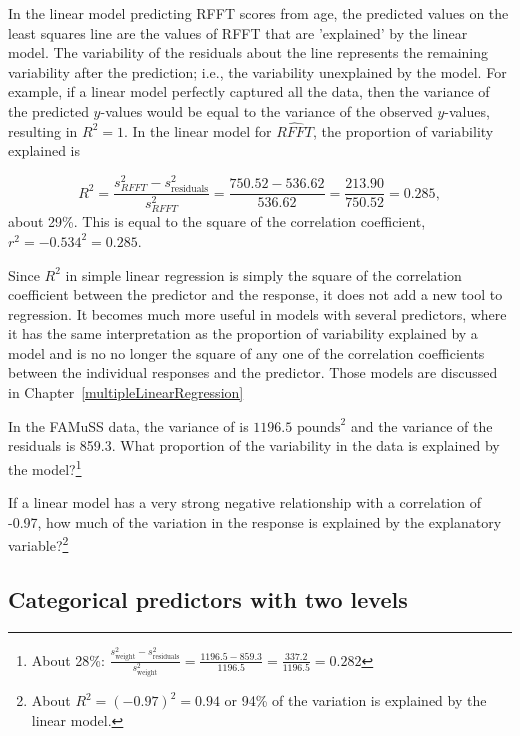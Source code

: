 In the linear model predicting RFFT scores from age, the predicted values on the least squares line are the values of RFFT that are 'explained' by the linear model. The variability of the residuals about the line represents the remaining variability after the prediction; i.e., the variability unexplained by the model. For example, if a linear model perfectly captured all the data, then the variance of the predicted $y$-values would be equal to the variance of the observed $y$-values, resulting in $R^2 = 1$. In the linear model for $\widehat{RFFT}$, the proportion of variability explained is

\[R^{2} = \dfrac{s^{2}_{RFFT} - s_{\text{residuals}}^2}{s^{2}_{RFFT}} = \dfrac{750.52 - 536.62}{536.62} = \dfrac{213.90}{750.52} = 0.285, \]
about 29\%. This is equal to the square of the correlation coefficient, $r^2 = -0.534^{2} = 0.285$. 

Since $R^2$ in simple linear regression is simply the square of the correlation coefficient between the predictor and the response, it does not add a new tool to regression.  It becomes much more  useful in models with several predictors, where it has the same interpretation as the proportion of variability explained by a model and is no no longer the square of any one of the correlation coefficients between the individual responses and the predictor.  Those models are discussed in Chapter~\ref{multipleLinearRegression}

\begin{exercise} In the FAMuSS data, the variance of  is $1196.5$ $\text{pounds}^2$ and the variance of the residuals is 859.3. What proportion of the variability in the data is explained by the model?\footnote{About 28\%: $\frac{s_{\text{weight}}^2 - s_{\text{residuals}}^2}{s_{\text{weight}}^2} = \frac{1196.5 - 859.3}{1196.5} = \frac{337.2}{1196.5} = 0.282$}
\end{exercise}

\begin{exercise}
If a linear model has a very strong negative relationship with a correlation of -0.97, how much of the variation in the response is explained by the explanatory variable?\footnote{About $R^2 = (-0.97)^2 = 0.94$ or 94\% of the variation is explained by the linear model.}
\end{exercise}


\subsection{Categorical predictors with two levels}
\label{categoricalPredictorsWithTwoLevels}

